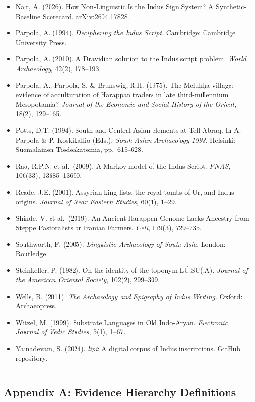 \documentclass[
  11pt,
]{article}
\begin{document}
\begin{itemize}
\item
  Nair, A. (2026). How Non-Linguistic Is the Indus Sign System? A
  Synthetic-Baseline Scorecard. arXiv:2604.17828.
\item
  Parpola, A. (1994). \emph{Deciphering the Indus Script}. Cambridge:
  Cambridge University Press.
\item
  Parpola, A. (2010). A Dravidian solution to the Indus script problem.
  \emph{World Archaeology}, 42(2), 178--193.
\item
  Parpola, A., Parpola, S. \& Brunswig, R.H. (1975). The Meluḥḥa
  village: evidence of acculturation of Harappan traders in late
  third-millennium Mesopotamia? \emph{Journal of the Economic and Social
  History of the Orient}, 18(2), 129--165.
\item
  Potts, D.T. (1994). South and Central Asian elements at Tell Abraq. In
  A. Parpola \& P. Koskikallio (Eds.), \emph{South Asian Archaeology
  1993}. Helsinki: Suomalainen Tiedeakatemia, pp.~615--628.
\item
  Rao, R.P.N. et al.~(2009). A Markov model of the Indus Script.
  \emph{PNAS}, 106(33), 13685--13690.
\item
  Reade, J.E. (2001). Assyrian king-lists, the royal tombs of Ur, and
  Indus origins. \emph{Journal of Near Eastern Studies}, 60(1), 1--29.
\item
  Shinde, V. et al.~(2019). An Ancient Harappan Genome Lacks Ancestry
  from Steppe Pastoralists or Iranian Farmers. \emph{Cell}, 179(3),
  729--735.
\item
  Southworth, F. (2005). \emph{Linguistic Archaeology of South Asia}.
  London: Routledge.
\item
  Steinkeller, P. (1982). On the identity of the toponym LÚ.SU(.A).
  \emph{Journal of the American Oriental Society}, 102(2), 299--309.
\item
  Wells, B. (2011). \emph{The Archaeology and Epigraphy of Indus
  Writing}. Oxford: Archaeopress.
\item
  Witzel, M. (1999). Substrate Languages in Old Indo-Aryan.
  \emph{Electronic Journal of Vedic Studies}, 5(1), 1--67.
\item
  Yajnadevam, S. (2024). \emph{lipi}: A digital corpus of Indus
  inscriptions. GitHub repository.
\end{itemize}

\begin{center}\rule{0.5\linewidth}{0.5pt}\end{center}

\subsection{Appendix A: Evidence Hierarchy
Definitions}\label{appendix-a-evidence-hierarchy-definitions}
\end{document}
